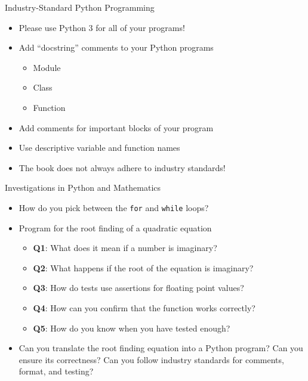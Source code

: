 \documentclass[14pt,aspectratio=169]{beamer}
\begin{document}
%
\begin{frame}{Industry-Standard Python Programming}
  \begin{itemize}
    \item Please use Python 3 for all of your programs!
      \vspace*{-.15in}
    \item Add ``docstring'' comments to your Python programs
      \begin{itemize}
        \item Module
        \item Class
        \item Function
      \end{itemize}
      \vspace*{-.2in}
    \item Add comments for important blocks of your program
      \vspace*{-.2in}
    \item Use descriptive variable and function names
      \vspace*{-.2in}
    \item The book does not always adhere to industry standards!
  \end{itemize}
\end{frame}

%
\begin{frame}{Investigations in Python and Mathematics}
  \begin{itemize}
    \item How do you pick between the {\tt for} and {\tt while} loops?
      \vspace*{-.15in}
    \item Program for the root finding of a quadratic equation
      \begin{itemize}
        \item {\bf Q1}: What does it mean if a number is imaginary?
        \item {\bf Q2}: What happens if the root of the equation is imaginary?
        \item {\bf Q3}: How do tests use assertions for floating point values?
        \item {\bf Q4}: How can you confirm that the function works correctly?
        \item {\bf Q5}: How do you know when you have tested enough?
      \end{itemize}
      \vspace*{-.2in}
    \item Can you translate the root finding equation into a Python program?
      Can you ensure its correctness? Can you follow industry standards for
      comments, format, and testing?
  \end{itemize}
\end{frame}
\end{document}
